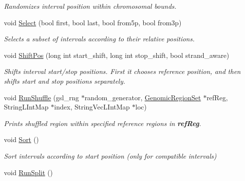 \begin{DoxyCompactItemize}
\begin{DoxyCompactList}\small\item\em Randomizes interval position within chromosomal bounds. \end{DoxyCompactList}\item 
\hypertarget{classGenomicRegionBED_adec7408315765bbdb21465a26400422b}{
void \hyperlink{classGenomicRegionBED_adec7408315765bbdb21465a26400422b}{Select} (bool first, bool last, bool from5p, bool from3p)}
\label{classGenomicRegionBED_adec7408315765bbdb21465a26400422b}

\begin{DoxyCompactList}\small\item\em Selects a subset of intervals according to their relative positions. \end{DoxyCompactList}\item 
void \hyperlink{classGenomicRegionBED_afd2f05cec2af5186794f40f221e040b1}{ShiftPos} (long int start\_\-shift, long int stop\_\-shift, bool strand\_\-aware)
\begin{DoxyCompactList}\small\item\em Shifts interval start/stop positions. First it chooses reference position, and then shifts start and stop positions separately. \end{DoxyCompactList}\item 
\hypertarget{classGenomicRegionBED_af3793387aa335bf68042f9245bc5992d}{
void \hyperlink{classGenomicRegionBED_af3793387aa335bf68042f9245bc5992d}{RunShuffle} (gsl\_\-rng $\ast$random\_\-generator, \hyperlink{classGenomicRegionSet}{GenomicRegionSet} $\ast$refReg, StringLIntMap $\ast$index, StringVecLIntMap $\ast$loc)}
\label{classGenomicRegionBED_af3793387aa335bf68042f9245bc5992d}

\begin{DoxyCompactList}\small\item\em Prints shuffled region within specified reference regions in {\bfseries refReg}. \end{DoxyCompactList}\item 
\hypertarget{classGenomicRegionBED_afd1a61c04f76782abdc83074ae0f7bd3}{
void \hyperlink{classGenomicRegionBED_afd1a61c04f76782abdc83074ae0f7bd3}{Sort} ()}
\label{classGenomicRegionBED_afd1a61c04f76782abdc83074ae0f7bd3}

\begin{DoxyCompactList}\small\item\em Sort intervals according to start position (only for compatible intervals) \end{DoxyCompactList}\item 
\hypertarget{classGenomicRegionBED_abd3b8e4969c2ff2639eb344de7b224f9}{
void \hyperlink{classGenomicRegionBED_abd3b8e4969c2ff2639eb344de7b224f9}{RunSplit} ()}
\label{classGenomicRegionBED_abd3b8e4969c2ff2639eb344de7b224f9}


\end{DoxyCompactItemize}
